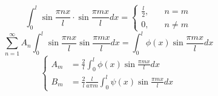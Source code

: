 \documentclass[a4paper]{article}
\begin{document}
\[
    \int_{0}^{l} \sin \frac{\pi n x}{l} \cdot \sin \frac{\pi m x}{l} dx =
    \begin{cases}
        \frac{l}{2}, &\quad n = m\\
        0, &\quad n \neq m
    \end{cases}
\]
\[
    \sum_{n=1}^{\infty} A_n \int_{0}^{l} \sin \frac{\pi n x}{l} \sin \frac{\pi m x}{l} 
    dx = \int_{0}^{l} \phi(x) \sin \frac{\pi m x}{l} dx
\]
\begin{equation}
    \begin{cases}
        A_m &= \frac{2}{l}\int_{0}^{l} \phi(x) \sin \frac{\pi m x}{l} dx\\
        B_m &= \frac{2}{l} \frac{l}{a \pi m} \int_{0}^{l} \psi(x) \sin \frac{\pi m x}{l} dx
    \end{cases}
\end{equation}
\end{document}
